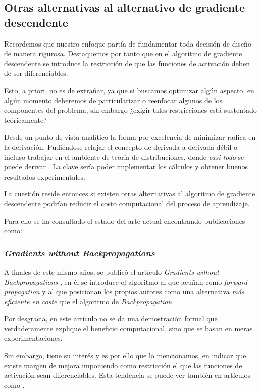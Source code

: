
\subsection{Otras alternativas al alternativo de gradiente descendente}  

Recordemos que nuestro enfoque partía de
fundamentar toda decisión de diseño de manera rigurosa. Destaquemos por tanto que en el algoritmo de gradiente descendente se introduce la restricción de que 
las funciones de activación deben de ser diferenciables.

Esto, a priori, no es de extrañar, ya que si buscamos optimizar algún aspecto, en algún momento deberemos de particularizar o reenfocar algunos de los componentes del problema, sin embargo ¿exigir tales restricciones está sustentado teóricamente? 

Desde un punto de vista analítico la forma por excelencia de minimizar radica en la derivación. Pudiéndose relajar el concepto de derivada a derivada débil o incluso trabajar en el ambiente de teoría de distribuciones, donde \textit{casi todo} se puede derivar \cite{teoriaDistribuciones}.
 La clave sería poder implementar los cálculos y obtener buenos resultados experimentales.

La cuestión reside entonces si existen otras alternativas al algoritmo de gradiente descendente podrían reducir el costo computacional del proceso de aprendizaje. 

Para ello se ha consultado el estado del arte actual encontrando publicaciones como: 

\subsubsection{\textit{Gradients without Backpropagations}}

A finales de este mismo años, se publicó el artículo \textit{Gradients without Backpropagations} \cite{forwardGradient}, en él se introduce el algoritmo al que acuñan como 
\textit{forward propagation} y al que posicionan los propios autores como una alternativa \textit{más eficiente en coste} que el algoritmo de \textit{Backpropagation}. 

Por desgracia, en este artículo no se da una demostración formal que verdaderamente explique el beneficio computacional, sino que se basan en meras experimentaciones. 

Sin embargo, tiene su interés y es por ello que lo mencionamos, en indicar que existe margen de mejora 
imponiendo como restricción el que las funciones de activación sean diferenciables. 
Esta tendencia se puede ver también en artículos como \cite{TransactionsOnNeuralNetworks}.



